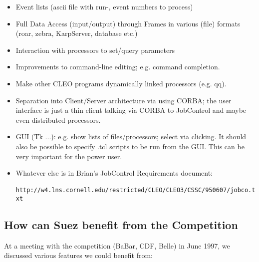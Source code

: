 \documentclass[12pt]{article}
\begin{document}
\begin{itemize}

  \item Event lists (ascii file with run-, event numbers to process)

  \item Full Data Access (input/output) through Frames in various (file)
formats (roar, zebra, KarpServer, database etc.)

  \item Interaction with processors to set/query parameters

  \item Improvements to command-line editing; e.g. command completion.

  \item Make other CLEO programs dynamically linked processors (e.g. qq).

  \item Separation into Client/Server architecture via using CORBA; the
  user interface is just a thin client talking via CORBA to JobControl
  and maybe even distributed processors.

  \item GUI (Tk ...): e.g. show lists of files/processors; select via
  clicking. It should also be possible to specify .tcl scripts to be run
  from the GUI. This can be very important for the power user.

  \item Whatever else is in Brian's JobControl Requirements document:\\
%
\verb= http://w4.lns.cornell.edu/restricted/CLEO/CLEO3/CSSC/950607/jobco.txt=

\end{itemize}


\subsection{How can Suez benefit from the Competition}
\label{sec:BenefitsThroughCompetition}

At a meeting with the competition (BaBar, CDF, Belle) in June 1997, we
discussed various features we could benefit from:
\end{document}
